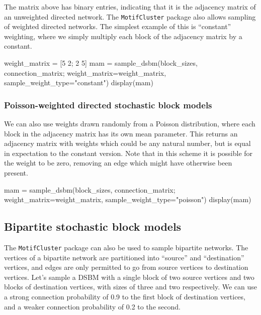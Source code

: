 \documentclass{article}
\begin{document}
The matrix above has binary entries,
indicating that it is the adjacency matrix of an unweighted
directed network.
The \texttt{MotifCluster} package also allows sampling of weighted directed networks.
The simplest example of this is ``constant'' weighting,
where we simply multiply each block of the adjacency matrix by a constant.

\begin{tcolorbox}[colback=black!5!white,colframe=black!15!white]
\begin{juliablock}
weight_matrix = [5 2; 2 5]
mam = sample_dsbm(block_sizes, connection_matrix;
                  weight_matrix=weight_matrix, sample_weight_type="constant")
display(mam)
\end{juliablock}
\texttt{\obeylines\printpythontex}
\end{tcolorbox}

\subsubsection{Poisson-weighted directed stochastic block models}

We can also use weights drawn randomly from a Poisson distribution,
where each block in the adjacency matrix has its own mean parameter.
This returns an adjacency matrix with weights which could be any natural
number, but is equal in expectation to the constant version.
Note that in this scheme it is possible for the weight to be zero,
removing an edge which might have otherwise been present.

\begin{tcolorbox}[colback=black!5!white,colframe=black!15!white]
\begin{juliablock}
mam = sample_dsbm(block_sizes, connection_matrix;
                  weight_matrix=weight_matrix,
                  sample_weight_type="poisson")
display(mam)
\end{juliablock}
\texttt{\obeylines\printpythontex}
\end{tcolorbox}


\subsection{Bipartite stochastic block models}

The \texttt{MotifCluster} package can also be used to sample
bipartite networks.
The vertices of a bipartite network are partitioned
into ``source'' and ``destination'' vertices,
and edges are only permitted to go from source vertices
to destination vertices.
Let's sample a DSBM with a single block of two source vertices
and two blocks of destination vertices, with
sizes of three and two respectively.
We can use a strong connection probability of 0.9 to the first block of
destination vertices,
and a weaker connection probability of 0.2 to the second.
\end{document}
